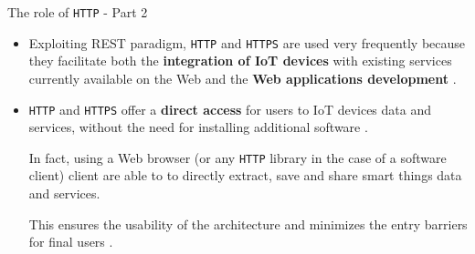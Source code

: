 \documentclass[10pt]{beamer}
\begin{document}
\begin{frame}{The role of \texttt{HTTP} - Part 2}

\begin{itemize}
\justifying
\item Exploiting REST paradigm, \texttt{HTTP} and \texttt{HTTPS} are used very frequently because they facilitate both the \textbf{integration of IoT devices} with existing services currently available on the Web and the  \textbf{Web applications development} \cite{IOTCITY}\cite{WOT}.

\item \texttt{HTTP} and \texttt{HTTPS} offer a \textbf{direct access} for users to IoT devices data and services, without the need for installing additional software \cite{IOTCITY}.

In fact, using a Web browser (or any \texttt{HTTP} library in the case of a software client) client are able to to directly extract, save and share smart things data and services. 

This ensures the usability of the architecture and minimizes the entry barriers for final users \cite{WOT}.
\end{itemize}

\end{frame} 
\end{document}
